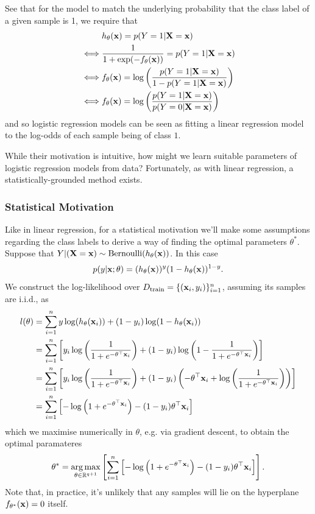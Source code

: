 \documentclass[11pt]{article}
\begin{document}
See that for the model to match the underlying probability that the class label of a given sample is 1, we require that
\begin{align*}
    &h_{\theta}(\mathbf{x})=p(Y=1|\mathbf{X}=\mathbf{x})\\
    \iff & \frac{1}{1+\exp(-f_{\theta}(\mathbf{x}))}=p(Y=1|\mathbf{X}=\mathbf{x})\\
    \iff & f_{\theta}(\mathbf{x}) = \log\left(\frac{p(Y=1|\mathbf{X}=\mathbf{x})}{1-p(Y=1|\mathbf{X}=\mathbf{x})}\right)\\
    \iff & f_{\theta}(\mathbf{x}) = \log\left(\frac{p(Y=1|\mathbf{X}=\mathbf{x})}{p(Y=0|\mathbf{X}=\mathbf{x})}\right)
\end{align*}
and so logistic regression models can be seen as fitting a linear regression model to the log-odds of each sample being of class $1$.

While their motivation is intuitive, how might we learn suitable parameters of logistic regression models from data? Fortunately, as with linear regression, a statistically-grounded method exists.

\subsubsection{Statistical Motivation}
Like in linear regression, for a statistical motivation we'll make some assumptions regarding the class labels to derive a way of finding the optimal parameters $\theta^{*}$. Suppose that $Y|(\mathbf{X}=\mathbf{x})\sim\text{Bernoulli}(h_{\theta}(\mathbf{x}))$. In this case
$$
p(y|\mathbf{x};\theta)=(h_{\theta}(\mathbf{x}))^{y}(1-h_{\theta}(\mathbf{x}))^{1-y}.
$$
We construct the log-likelihood over $D_{\text{train}}=\{(\mathbf{x}_i,y_i)\}_{i=1}^n$, assuming its samples are i.i.d., as
\begin{align*}
    l(\theta)
    &=
    \sum_{i=1}^ny\log(h_{\theta}(\mathbf{x}_i))+(1-y_i)\log(1-h_{\theta}(\mathbf{x}_i))\\
    &=
    \sum_{i=1}^n\left[y_i\log\left(\frac{1}{1+e^{-\theta^{\top}\mathbf{x}_i}}\right)+(1-y_i)\log\left(1-\frac{1}{1+e^{-\theta^{\top}\mathbf{x}_i}}\right)\right]\\
    &=
    \sum_{i=1}^n\left[y_i\log\left(\frac{1}{1+e^{-\theta^{\top}\mathbf{x}_i}}\right)+(1-y_i)\left(-\theta^{\top}\mathbf{x}_i+\log\left(\frac{1}{1+e^{-\theta^{\top}\mathbf{x}_i}}\right)\right)\right]\\
    &=
    \sum_{i=1}^n\left[-\log\left(1+e^{-\theta^{\top}\mathbf{x}_i}\right)-(1-y_i)\theta^{\top}\mathbf{x}_i\right]
\end{align*}
which we maximise numerically in $\theta$, e.g. via gradient descent, to obtain the optimal paramateres
$$
\theta^{*}
=
\operatorname*{arg\,max}_{\theta\in\mathbb{R}^{q+1}}\left[\sum_{i=1}^n\left[-\log\left(1+e^{-\theta^{\top}\mathbf{x}_i}\right)-(1-y_i)\theta^{\top}\mathbf{x}_i\right]\right].
$$
Note that, in practice, it's unlikely that any samples will lie on the hyperplane $f_{\theta^*}(\mathbf{x})=0$ itself.
\end{document}
